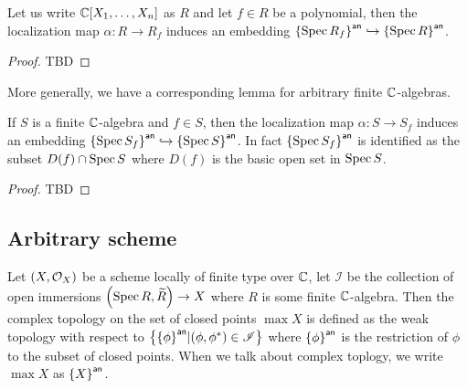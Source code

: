 \begin{lemma}
	Let us write $\mathbb{C}[X_{1},\dots,X_{n}]$ as $R$ and let $f \in R$ be a polynomial, then the localization map $\alpha : R \to R_{f}$ induces an embedding ${\left\{{\operatorname{Spec}{R_{f}}}\right\}}^{\mathsf{an}} \hookrightarrow {\left\{{\ensuremath{\operatorname{Spec}}{R}}\right\}}^{\mathsf{an}}$.
\end{lemma}
\begin{proof}
	TBD
\end{proof}

More generally, we have a corresponding lemma for arbitrary finite $\mathbb{C}$-algebras.

\begin{lemma}
	If $S$ is a finite $\mathbb{C}$-algebra and $f \in S$, then the localization map $\alpha : S \to S_{f}$ induces an embedding ${\left\{{\operatorname{Spec}{S_{f}}}\right\}}^{\mathsf{an}} \hookrightarrow {\left\{{\ensuremath{\operatorname{Spec}}{S}}\right\}}^{\mathsf{an}}$. In fact ${\left\{{\operatorname{Spec}{S_{f}}}\right\}}^{\mathsf{an}}$ is identified as the subset $D(f) \cap \operatorname{Spec}{S}$ where $D(f)$ is the basic open set in $\operatorname{Spec}{S}$.
\end{lemma}

\begin{proof}
	TBD
\end{proof}

\subsection{Arbitrary scheme}

\begin{definition}
	Let $\left(X, \mathcal{O}_{X}\right)$ be a scheme locally of finite type over $\mathbb{C}$, let $\mathscr{I}$ be the collection of open immersions $\left(\operatorname*{Spec}{R}, \widetilde{R}\right) \to X$ where $R$ is some finite $\mathbb{C}$-algebra. Then the complex topology on the set of closed points $\max X$ is defined as the weak topology with respect to $\left\{{\left\{{{\phi}}\right\}}^{\mathsf{an}} | (\phi, \phi^{*}) \in \mathscr{I}\right\}$ where ${\left\{{\phi}\right\}}^{\mathsf{an}}$ is the restriction of $\phi$ to the subset of closed points. When we talk about complex toplogy, we write $\max{X}$ as ${\left\{{X}\right\}}^{\mathsf{an}}$.
\end{definition}


